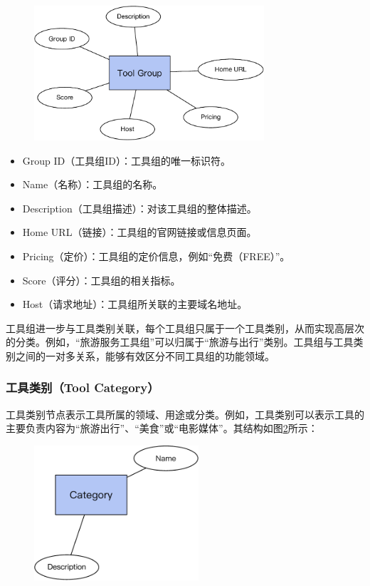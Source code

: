 \begin{figure}[H]
    \vspace{1em}
    \centering
    \setlength{\abovecaptionskip}{10pt} %
    \includegraphics[height=5cm]{../assets/图谱格式-tool group.pdf}
    \label{fig:ch3-kg-tool-group}
  \end{figure}

\begin{itemize}
    \item Group ID（工具组ID）：工具组的唯一标识符。
    \item Name（名称）：工具组的名称。
    \item Description（工具组描述）：对该工具组的整体描述。
    \item Home URL（链接）：工具组的官网链接或信息页面。
    \item Pricing（定价）：工具组的定价信息，例如``免费（FREE）''。
    \item Score（评分）：工具组的相关指标。
    \item Host（请求地址）：工具组所关联的主要域名地址。
\end{itemize}

工具组进一步与工具类别关联，每个工具组只属于一个工具类别，从而实现高层次的分类。例如，“旅游服务工具组”可以归属于“旅游与出行”类别。工具组与工具类别之间的一对多关系，能够有效区分不同工具组的功能领域。

\subsubsection{工具类别（Tool Category）}
工具类别节点表示工具所属的领域、用途或分类。例如，工具类别可以表示工具的主要负责内容为“旅游出行”、“美食”或“电影媒体”。其结构如图\ref{fig:ch3-kg-category}所示：

\begin{figure}[H]
    \vspace{1em}
    \centering
    \setlength{\abovecaptionskip}{10pt} %
    \includegraphics[height=5cm]{../assets/图谱格式-category.pdf}
    \label{fig:ch3-kg-category}
  \end{figure}

